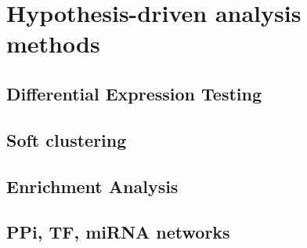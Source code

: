 \section{Hypothesis-driven analysis methods}    

    \subsection{Differential Expression Testing}

    \subsection{Soft clustering}
    
    \subsection{Enrichment Analysis}
    
    \subsection{PPi, TF, miRNA networks}